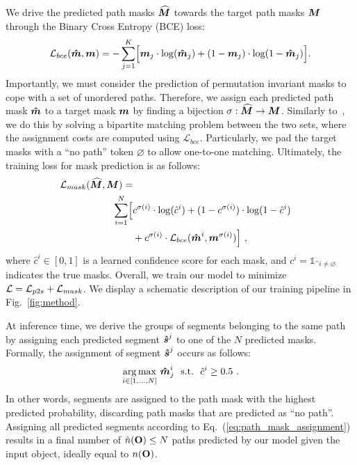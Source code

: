 We drive the predicted path masks $\boldsymbol{\widehat{M}}$ towards the target path masks $\boldsymbol{M}$ through the Binary Cross Entropy (BCE) loss:
\begin{equation}
\label{eq:bce_loss}
    \mathcal{L}_{bce}(\boldsymbol{\hat{m}}, \boldsymbol{m}) = - \sum_{j=1}^{K}\Bigl[\boldsymbol{m}_j\cdot\log(\boldsymbol{\hat{m}}_j) + (1-\boldsymbol{m}_j)\cdot\log(1-\boldsymbol{\hat{m}}_j)\Bigl].
\end{equation}
Importantly, we must consider the prediction of permutation invariant masks to cope with a set of unordered paths.
Therefore, we assign each predicted path mask $\boldsymbol{\hat{m}}$ to a target mask $\boldsymbol{m}$ by finding a bijection $ \sigma : \boldsymbol{\widehat{M}} \rightarrow \boldsymbol{M}$.
%
Similarly to~\cite{carion2020detr,cheng2021maskformer}, we do this by solving a bipartite matching problem between the two sets, where the assignment costs are computed using $\mathcal{L}_{bce}$.
%
Particularly, we pad the target masks with a ``no path'' token $\varnothing$ to allow one-to-one matching.
Ultimately, the training loss for mask prediction is as follows:
\begin{equation}
\begin{split}
    \mathcal{L}_{mask}(\boldsymbol{\widehat{M}}, \boldsymbol{M}) = \\ \sum_{i=1}^{N}
    \Bigl[ 
        & c^{\sigma(i)}\cdot\log(\hat{c}^i) + (1-c^{\sigma(i)})\cdot\log(1-\hat{c}^i) \\
        & + c^{\sigma(i)} \cdot
         \mathcal{L}_{bce}(\boldsymbol{\hat{m}}^i, \boldsymbol{m}^{\sigma(i)})
    \Bigl]~,
\end{split}
\end{equation}
where $\hat{c}^i \in [0,1]$ is a learned confidence score for each mask, and $c^i{=}\mathds{1}_{\bm^i \neq \varnothing}$ indicates the true masks.
Overall, we train our model to minimize $\mathcal{L} = \mathcal{L}_{p2s} + \mathcal{L}_{mask}$. 
We display a schematic description of our training pipeline in Fig.~\ref{fig:method}.

At inference time, we derive the groups of segments belonging to the same path by assigning each predicted segment $\boldsymbol{\hat{s}}^j$ to one of the $N$ predicted masks. Formally, the assignment of segment $\boldsymbol{\hat{s}}^j$ occurs as follows:
\begin{equation}
\label{eq:path_mask_assignment}
    \begin{split}
        \underset{i \in [1, \dots, N]}{\operatorname*{arg\,max}} \ \boldsymbol{\hat{m}}^i_j \ \ \text{s.t.} \ \ \hat{c}^i \geq 0.5~.
    \end{split}
\end{equation}
In other words, segments are assigned to the path mask with the highest predicted probability, discarding path masks that are predicted as ``no path''. Assigning all predicted segments according to Eq.~(\ref{eq:path_mask_assignment}) results in a final number of $\hat{n}(\mathbf{O})\leq N$ paths predicted by our model given the input object, ideally equal to $n(\mathbf{O})$.


